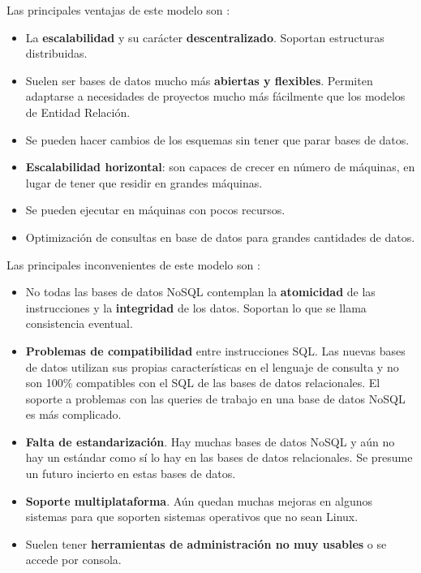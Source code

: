 Las principales ventajas de este modelo son \cite{ref9}:

\begin{itemize}
	\item La \textbf{escalabilidad} y su carácter \textbf{descentralizado}. Soportan estructuras distribuidas.
	
	\item Suelen ser bases de datos mucho más \textbf{abiertas y flexibles}. Permiten adaptarse a necesidades de proyectos mucho más fácilmente que los modelos de Entidad Relación.
	    
	\item Se pueden hacer cambios de los esquemas sin tener que parar bases de datos.
	    
	\item \textbf{Escalabilidad horizontal}: son capaces de crecer en número de máquinas, en lugar de tener que residir en grandes máquinas.
	    
	\item Se pueden ejecutar en máquinas con pocos recursos.
	    
	\item Optimización de consultas en base de datos para grandes cantidades de datos.
\end{itemize}

Las principales inconvenientes de este modelo son \cite{ref9}:

\begin{itemize}
	\item No todas las bases de datos NoSQL contemplan la \textbf{atomicidad} de las instrucciones y la \textbf{integridad} de los datos. Soportan lo que se llama consistencia eventual.
	
	\item \textbf{Problemas de compatibilidad} entre instrucciones SQL. Las nuevas bases de datos utilizan sus propias características en el lenguaje de consulta y no son 100\% compatibles con el SQL de las bases de datos relacionales. El soporte a problemas con las queries de trabajo en una base de datos NoSQL es más complicado.
	
	\item \textbf{Falta de estandarización}. Hay muchas bases de datos NoSQL y aún no hay un estándar como sí lo hay en las bases de datos relacionales. Se presume un futuro incierto en estas bases de datos.
	
	\item \textbf{Soporte multiplataforma}. Aún quedan muchas mejoras en algunos sistemas para que soporten sistemas operativos que no sean Linux.
	
	\item Suelen tener \textbf{herramientas de administración no muy usables} o se accede por consola.
\end{itemize}

\newpage